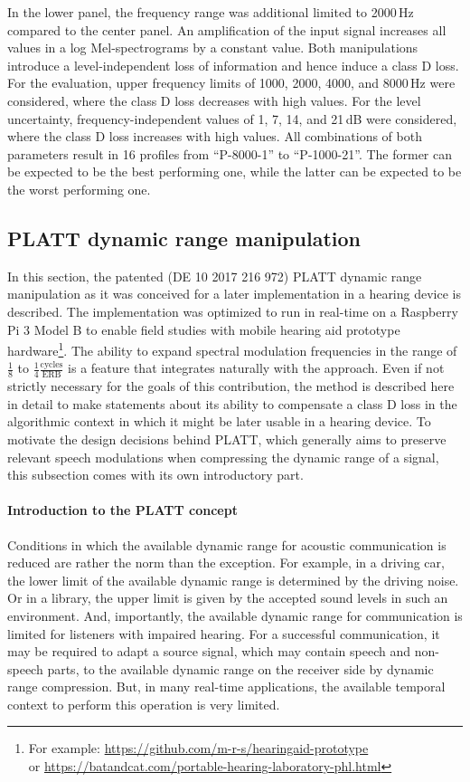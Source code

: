 \documentclass[10pt,a4paper,twocolumn]{article}
\begin{document}
%
In the lower panel, the frequency range was additional limited to 2000\,Hz compared to the center panel.
%
An amplification of the input signal increases all values in a log Mel-spectrograms by a constant value.
%
Both manipulations introduce a level-independent loss of information and hence induce a class D loss.
%
For the evaluation, upper frequency limits of 1000, 2000, 4000, and 8000\,Hz were considered, where the class D loss decreases with high values.
%
For the level uncertainty, frequency-independent values of 1, 7, 14, and 21\,dB were considered, where the class D loss increases with high values.
%
All combinations of both parameters result in 16 profiles from \enquote{P-8000-1} to \enquote{P-1000-21}.
%
The former can be expected to be the best performing one, while the latter can be expected to be the worst performing one.

\subsection*{PLATT dynamic range manipulation}
\label{sec:platt}
%
In this section, the patented (DE 10 2017 216 972) PLATT dynamic range manipulation as it was conceived for a later implementation in a hearing device is described.
%
The implementation was optimized to run in real-time on a Raspberry Pi 3 Model B to enable field studies with mobile hearing aid prototype hardware\footnote{For example: \url{https://github.com/m-r-s/hearingaid-prototype}\\ or \url{https://batandcat.com/portable-hearing-laboratory-phl.html}}.
%
The ability to expand spectral modulation frequencies in the range of $\frac{1}{8}$ to $\frac{1}{4}\frac{\text{cycles}}{\text{ERB}}$ is a feature that integrates naturally with the approach.
%
Even if not strictly necessary for the goals of this contribution, the method is described here in detail to make statements about its ability to compensate a class D loss in the algorithmic context in which it might be later usable in a hearing device.
%
To motivate the design decisions behind PLATT, which generally aims to preserve relevant speech modulations when compressing the dynamic range of a signal, this subsection comes with its own introductory part.

\paragraph{Introduction to the PLATT concept}
%
Conditions in which the available dynamic range for acoustic communication is reduced are rather the norm than the exception.
%
For example, in a driving car, the lower limit of the available dynamic range is determined by the driving noise.
%
Or in a library, the upper limit is given by the accepted sound levels in such an environment.
%
And, importantly, the available dynamic range for communication is limited for listeners with impaired hearing.
%
For a successful communication, it may be required to adapt a source signal, which may contain speech and non-speech parts, to the available dynamic range on the receiver side by dynamic range compression.
%
But, in many real-time applications, the available temporal context to perform this operation is very limited.
\end{document}
